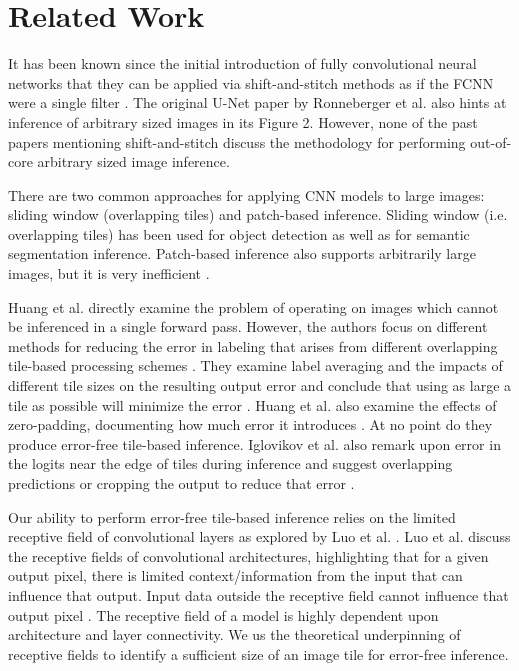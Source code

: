 \documentclass[runningheads]{llncs}
\begin{document}
\section{Related Work}
\label{related-work}

It has been known since the initial introduction of fully convolutional neural networks that they can be applied via shift-and-stitch methods as if the FCNN were a single filter \cite{Long2015,Sherrah2016}.
The original U-Net paper by Ronneberger et al. \cite{Ronneberger2015a} also hints at inference of arbitrary sized images in its Figure 2. However, none of the past papers mentioning shift-and-stitch discuss the methodology for performing out-of-core arbitrary sized image inference.

There are two common approaches for applying CNN models to large images: sliding window (overlapping tiles) and patch-based inference. Sliding window (i.e. overlapping tiles) has been used for object detection \cite{Sermanet2013,VanEtten2019} as well as for semantic segmentation \cite{Lin2019,Volpi2017a} inference. Patch-based inference also supports arbitrarily large images, but it is very inefficient \cite{Volpi2017a,Maggiori2016}.

Huang et al. directly examine the problem of operating on images which cannot be inferenced in a single forward pass. However, the authors focus on different methods for reducing the error in labeling that arises from different overlapping tile-based processing schemes \cite{Huang2019a}. They examine label averaging and the impacts of different tile sizes on the resulting output error and conclude that using as large a tile as possible will minimize the error \cite{Huang2019a}. Huang et al. also examine the effects of zero-padding, documenting how much error it introduces \cite{Huang2019a}. At no point do they produce error-free tile-based inference. Iglovikov et al. also remark upon error in the logits near the edge of tiles during inference and suggest overlapping predictions or cropping the output to reduce that error \cite{Iglovikov2017}. 

Our ability to perform error-free tile-based inference relies on the limited receptive field of convolutional layers as explored by Luo et al. \cite{Luo2016}. Luo et al. \cite{Luo2016} discuss the receptive fields of convolutional architectures, highlighting that for a given output pixel, there is limited context/information from the input that can influence that output. Input data outside the receptive field cannot influence that output pixel \cite{Luo2016}. The receptive field of a model is highly dependent upon architecture and layer connectivity. We us the theoretical underpinning of receptive fields to identify a sufficient size of an image tile for error-free inference.  
\end{document}
